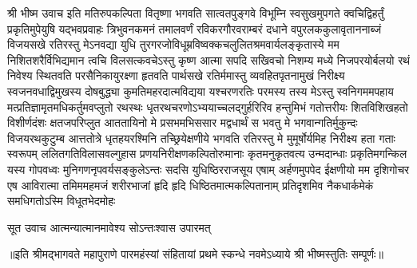 
श्री भीष्म उवाच\nopagebreak[4]
\twolineshloka
{इति मतिरुपकल्पिता वितृष्णा भगवति सात्वतपुङ्गवे विभूम्नि}
{स्वसुखमुपगते क्वचिद्विहर्तुं प्रकृतिमुपेयुषि यद्भवप्रवाहः}
\twolineshloka
{त्रिभुवनकमनं तमालवर्णं रविकरगौरवराम्बरं दधाने}
{वपुरलककुलावृताननाब्जं विजयसखे रतिरस्तु मेऽनवद्या}
\twolineshloka
{युधि तुरगरजोविधूम्रविष्वक्कचलुलितश्रमवार्यलङ्कृतास्ये}
{मम निशितशरैर्विभिद्यमान त्वचि विलसत्कवचेऽस्तु कृष्ण आत्मा}
\twolineshloka
{सपदि सखिवचो निशम्य मध्ये निजपरयोर्बलयो रथं निवेश्य}
{स्थितवति परसैनिकायुरक्ष्णा हृतवति पार्थसखे रतिर्ममास्तु}
\twolineshloka
{व्यवहितपृतनामुखं निरीक्ष्य स्वजनवधाद्विमुखस्य दोषबुद्ध्या}
{कुमतिमहरदात्मविद्यया यश्चरणरतिः परमस्य तस्य मेऽस्तु}
\twolineshloka
{स्वनिगममपहाय मत्प्रतिज्ञामृतमधिकर्तुमवप्लुतो रथस्थः}
{धृतरथचरणोऽभ्ययाच्चलद्गुर्हरिरिव हन्तुमिभं गतोत्तरीयः}
\twolineshloka
{शितविशिखहतो विशीर्णदंशः क्षतजपरिप्लुत आततायिनो मे}
{प्रसभमभिससार मद्वधार्थं स भवतु मे भगवान्गतिर्मुकुन्दः}
\twolineshloka
{विजयरथकुटुम्ब आत्ततोत्रे धृतहयरश्मिनि तच्छ्रियेक्षणीये}
{भगवति रतिरस्तु मे मुमूर्षोर्यमिह निरीक्ष्य हता गताः स्वरूपम्}
\twolineshloka
{ललितगतिविलासवल्गुहास प्रणयनिरीक्षणकल्पितोरुमानाः}
{कृतमनुकृतवत्य उन्मदान्धाः प्रकृतिमगन्किल यस्य गोपवध्वः}
\twolineshloka
{मुनिगणनृपवर्यसङ्कुलेऽन्तः सदसि युधिष्ठिरराजसूय एषाम्}
{अर्हणमुपपेद ईक्षणीयो मम दृशिगोचर एष आविरात्मा}
\twolineshloka
{तमिममहमजं शरीरभाजां हृदि हृदि धिष्ठितमात्मकल्पितानाम्}
{प्रतिदृशमिव नैकधार्कमेकं समधिगतोऽस्मि विधूतभेदमोहः}

सूत उवाच\nopagebreak[4]
{आत्मन्यात्मानमावेश्य सोऽन्तःश्वास उपारमत्}

{॥इति श्रीमद्भागवते महापुराणे पारमहंस्यां संहितायां प्रथमे स्कन्धे नवमेऽध्याये श्री भीष्मस्तुतिः सम्पूर्णः॥}
